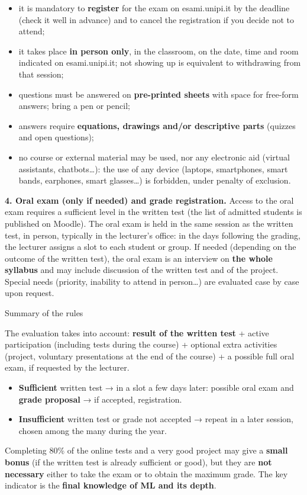 \begin{itemize}
\tightlist
\item
  it is mandatory to \textbf{register} for the exam on esami.unipi.it
  by the deadline (check it well in advance) and to cancel the
  registration if you decide not to attend;
\item
  it takes place \textbf{in person only}, in the classroom, on the
  date, time and room indicated on esami.unipi.it; not showing up is
  equivalent to withdrawing from that session;
\item
  questions must be answered on \textbf{pre-printed sheets} with space
  for free-form answers; bring a pen or pencil;
\item
  answers require \textbf{equations, drawings and/or descriptive parts}
  (quizzes and open questions);
\item
  no course or external material may be used, nor any electronic aid
  (virtual assistants, chatbots\ldots): the use of any device (laptops,
  smartphones, smart bands, earphones, smart glasses\ldots) is
  forbidden, under penalty of exclusion.
\end{itemize}

\textbf{4. Oral exam (only if needed) and grade registration.} Access
to the oral exam requires a sufficient level in the written test (the
list of admitted students is published on Moodle). The oral exam is
held in the same session as the written test, in person, typically in
the lecturer's office: in the days following the grading, the lecturer
assigns a slot to each student or group. If needed (depending on the
outcome of the written test), the oral exam is an interview on
\textbf{the whole syllabus} and may include discussion of the written
test and of the project. Special needs (priority, inability to attend
in person\ldots) are evaluated case by case upon request.

\begin{boxabstract}{Summary of the rules}

The evaluation takes into account: \textbf{result of the written test}
+ active participation (including tests during the course) + optional
extra activities (project, voluntary presentations at the end of the
course) + a possible full oral exam, if requested by the lecturer.

\begin{itemize}
\tightlist
\item
  \textbf{Sufficient} written test → in a slot a few days later:
  possible oral exam and \textbf{grade proposal} → if accepted,
  registration.
\item
  \textbf{Insufficient} written test or grade not accepted → repeat in
  a later session, chosen among the many during the year.
\end{itemize}

Completing 80\% of the online tests and a very good project may give a
\textbf{small bonus} (if the written test is already sufficient or
good), but they are \textbf{not necessary} either to take the exam or
to obtain the maximum grade. The key indicator is the \textbf{final
knowledge of ML and its depth}.

\end{boxabstract}

